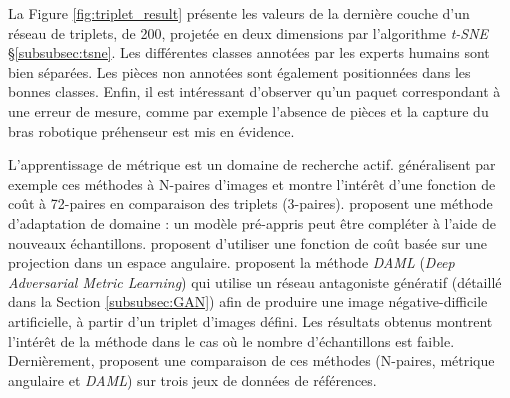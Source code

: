 La Figure \ref{fig:triplet_result} présente les valeurs de la dernière couche d'un réseau de triplets, de 200, projetée en deux dimensions par l'algorithme \textit{t-SNE} §\ref{subsubsec:tsne}.
Les différentes classes annotées par les experts humains sont bien séparées.
Les pièces non annotées sont également positionnées dans les bonnes classes.
Enfin, il est intéressant d'observer qu'un paquet correspondant à une erreur de mesure, comme par exemple l'absence de pièces et la capture du bras robotique préhenseur est mis en évidence.

L'apprentissage de métrique est un domaine de recherche actif.
\citeauthor{sohn_improved_2016} \cite{sohn_improved_2016} généralisent par exemple ces méthodes à N-paires d'images et montre l'intérêt d'une fonction de coût à 72-paires en comparaison des triplets (3-paires).
\citeauthor{song_deep_2015} \cite{song_deep_2015} proposent une méthode d'adaptation de domaine : un modèle pré-appris peut être compléter à l'aide de nouveaux échantillons.
\cite{wang_deep_2017} \citeauthor{wang_deep_2017} proposent d'utiliser une fonction de coût basée sur une projection dans un espace angulaire.
\citeauthor{duan_deep_2018} \cite{duan_deep_2018} proposent la méthode \textit{DAML} (\textit{Deep Adversarial Metric Learning}) qui utilise un réseau antagoniste génératif (détaillé dans la Section \ref{subsubsec:GAN}) afin de produire une image négative-difficile artificielle, à partir d'un triplet d'images défini.
Les résultats obtenus montrent l'intérêt de la méthode dans le cas où le nombre d'échantillons est faible.
Dernièrement, \citeauthor{zheng_hardness-aware_2019} \cite{zheng_hardness-aware_2019} proposent une comparaison de ces méthodes (N-paires, métrique angulaire et \textit{DAML}) sur trois jeux de données de références.





